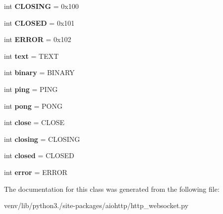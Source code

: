 \begin{DoxyCompactItemize}
int {\bfseries C\+L\+O\+S\+I\+NG} = 0x100
\item 
\mbox{\label{classaiohttp_1_1http__websocket_1_1_w_s_msg_type_acfaca4308da651edd2c32faf67c63835}} 
int {\bfseries C\+L\+O\+S\+ED} = 0x101
\item 
\mbox{\label{classaiohttp_1_1http__websocket_1_1_w_s_msg_type_a14fb879aefbf40fb20c286e994f030c8}} 
int {\bfseries E\+R\+R\+OR} = 0x102
\item 
\mbox{\label{classaiohttp_1_1http__websocket_1_1_w_s_msg_type_aa56735ba4beeb183615084d725edd376}} 
int {\bfseries text} = T\+E\+XT
\item 
\mbox{\label{classaiohttp_1_1http__websocket_1_1_w_s_msg_type_a1a65c8766ad248589cd29eb79b493348}} 
int {\bfseries binary} = B\+I\+N\+A\+RY
\item 
\mbox{\label{classaiohttp_1_1http__websocket_1_1_w_s_msg_type_a920bec0f93dbfdd1ecd8223da1e76c05}} 
int {\bfseries ping} = P\+I\+NG
\item 
\mbox{\label{classaiohttp_1_1http__websocket_1_1_w_s_msg_type_a17ba404a10cc1dc62e235fb5919ff510}} 
int {\bfseries pong} = P\+O\+NG
\item 
\mbox{\label{classaiohttp_1_1http__websocket_1_1_w_s_msg_type_a0872d9461002c8330eac3a02afe70cb5}} 
int {\bfseries close} = C\+L\+O\+SE
\item 
\mbox{\label{classaiohttp_1_1http__websocket_1_1_w_s_msg_type_a0c6c74e8b96f26cefc2af06b6b8373f3}} 
int {\bfseries closing} = C\+L\+O\+S\+I\+NG
\item 
\mbox{\label{classaiohttp_1_1http__websocket_1_1_w_s_msg_type_ad1cf3b250f1d5bd90d71c554b6019636}} 
int {\bfseries closed} = C\+L\+O\+S\+ED
\item 
\mbox{\label{classaiohttp_1_1http__websocket_1_1_w_s_msg_type_a3adea51080afc2ed1475304da42fa3fb}} 
int {\bfseries error} = E\+R\+R\+OR
\end{DoxyCompactItemize}


The documentation for this class was generated from the following file\+:\begin{DoxyCompactItemize}
\item 
venv/lib/python3./site-\/packages/aiohttp/http\+\_\+websocket.\+py\end{DoxyCompactItemize}
